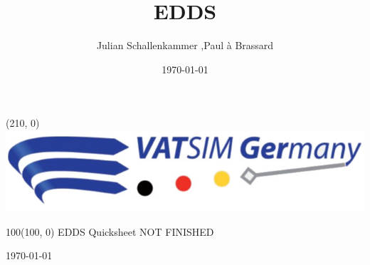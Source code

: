 \documentclass[10pt,landscape,a4paper]{article}
\title{EDDS}
\author{Julian Schallenkammer ,Paul à Brassard}
\date{\today}
\begin{document}
\setlength\extrarowheight{1pt}

\setlength{\TPHorizModule}{1mm}
\setlength{\TPVertModule}{\TPHorizModule}
\textblockorigin{7mm}{12mm}

\begin{textblock}{2}(210, 0)
  \includegraphics[width=30\textwidth]{VATGer-Logo-Colour}
\end{textblock}


\begin{textblock}{100}(100, 0)
  \large
  \centering
  EDDS Quicksheet NOT FINISHED

  \today
\end{textblock}
\end{document}
